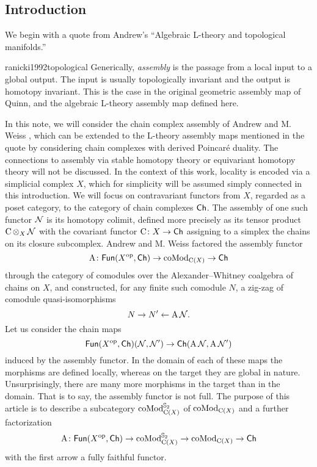 
\subsection{Introduction} \label{ss:introduction}

We begin with a quote from Andrew's ``Algebraic L-theory and topological manifolds.''
\begin{displaycquote}{ranicki1992topological}
	Generically, \textit{assembly} is the passage from a local input to a global output.
	The input is usually topologically invariant and the output is homotopy invariant.
	This is the case in the original geometric assembly map of Quinn, and the algebraic L-theory assembly map defined here.
\end{displaycquote}
In this note, we will consider the chain complex assembly of Andrew and M. Weiss \cite{ranicki1990assembly}, which can be extended to the L-theory assembly maps mentioned in the quote by considering chain complexes with derived Poincar\'e duality.
The connections to assembly via stable homotopy theory \cite{weiss1995asssembly} or equivariant homotopy theory \cite{davis1998assembly} will not be discussed.
In the context of this work, locality is encoded via a simplicial complex $X$, which for simplicity will be assumed simply connected in this introduction.
We will focus on contravariant functors from $X$, regarded as a poset category, to the category of chain complexes $\mathsf{Ch}$.
The assembly of one such functor $\mathcal{N}$ is its homotopy colimit, defined more precisely as its tensor product $\operatorname{C} \operatorname*{\otimes}_X \mathcal{N}$ with the covariant functor $\operatorname{C} \colon X \to \mathsf{Ch}$ assigning to a simplex the chains on its closure subcomplex.
Andrew and M. Weiss factored the assembly functor
\[
\operatorname{A} \colon \mathsf{Fun}(X^{\mathrm{op}}, \mathsf{Ch}) \to \operatorname{coMod}_{\operatorname{C}(X)} \to \mathsf{Ch}
\]
through the category of comodules over the Alexander--Whitney coalgebra of chains on $X$, and constructed, for any finite such comodule $N$, a zig-zag of comodule quasi-isomorphisms
\[
N \to N' \leftarrow \operatorname{A} \mathcal{N}.
\]
Let us consider the chain maps
\[
\mathsf{Fun}(X^{\mathrm{op}},\mathsf{Ch})(\mathcal{N},\mathcal{N}') \to \mathsf{Ch}(\operatorname{A} \mathcal{N}, \operatorname{A} \mathcal{N}')
\]
induced by the assembly functor.
In the domain of each of these maps the morphisms are defined locally, whereas on the target they are global in nature.
Unsurprisingly, there are many more morphisms in the target than in the domain.
That is to say, the assembly functor is not full.
The purpose of this article is to describe a subcategory $\operatorname{coMod}^{\mathbb{S}_2}_{\operatorname{C}(X)}$ of $\operatorname{coMod}_{\operatorname{C}(X)}$ and a further factorization
\[
\operatorname{A} \colon \mathsf{Fun}(X^{\mathrm{op}}, \mathsf{Ch}) \to
\operatorname{coMod}^{\mathbb{S}_2}_{\operatorname{C}(X)} \to
\operatorname{coMod}_{\operatorname{C}(X)} \to
\mathsf{Ch}
\]
with the first arrow a fully faithful functor.


